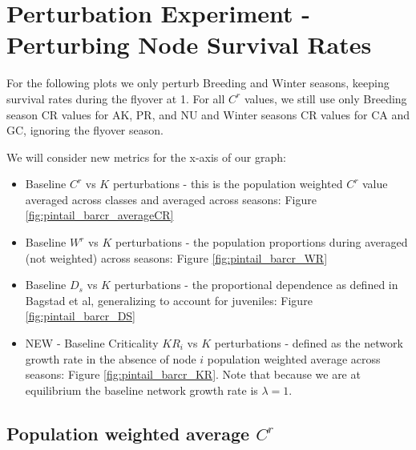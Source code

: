 \documentclass[10pt]{article}
\begin{document}
\newpage 




\section{Perturbation Experiment - Perturbing Node Survival Rates}

For the following plots we only perturb Breeding and Winter seasons, keeping survival rates during the flyover at 1. For all $C^r$ values, we still use only Breeding season CR values for AK, PR, and NU and Winter seasons CR values for CA and GC, ignoring the flyover season. 

We will consider new metrics for the x-axis of our graph:
\begin{itemize}
\item Baseline $C^r$ vs $K$ perturbations - this is the population weighted $C^r$ value averaged across classes and averaged across seasons: Figure \ref{fig:pintail_barcr_averageCR}
\item Baseline $W^r$ vs $K$ perturbations - the population proportions during averaged (not weighted) across seasons: Figure \ref{fig:pintail_barcr_WR}
\item Baseline $D_s$ vs $K$ perturbations - the proportional dependence as defined in Bagstad et al, generalizing to account for juveniles: Figure \ref{fig:pintail_barcr_DS}
\item NEW - Baseline Criticality $KR_i$ vs $K$ perturbations - defined as the network growth rate in the absence of node $i$ population weighted average across seasons: Figure \ref{fig:pintail_barcr_KR}. Note that because we are at equilibrium the baseline network growth rate is $\lambda = 1$.
\end{itemize}


\newpage
\subsection{Population weighted average \texorpdfstring{$C^r$}{CR}}
\end{document}
